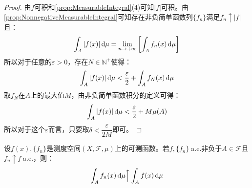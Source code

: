 \begin{proof}
	由$f$可积和\cref{prop:MeasurableIntegral}(4)可知$|f|$可积。由\cref{prop:NonnegativeMeasurableIntegral}可知存在非负简单函数列$\{f_n\}$满足$f_n\uparrow |f|$且：
	\begin{equation*}
		\int_{A}|f(x)|\mathop{}\!\mathrm{d}\mu=\lim_{n\to+\infty}\left[\int_{A}f_n(x)\mathop{}\!\mathrm{d}\mu\right]
	\end{equation*}
	所以对于任意的$\varepsilon>0$，存在$N\in\mathbb{N}^+$使得：
	\begin{equation*}
		\int_{A}|f(x)|\mathop{}\!\mathrm{d}\mu<\frac{\varepsilon}{2}+\int_{A}f_N(x)\mathop{}\!\mathrm{d}\mu
	\end{equation*}
	取$f_N$在$A$上的最大值$M$，由非负简单函数积分的定义可得：
	\begin{equation*}
		\int_{A}|f(x)|\mathop{}\!\mathrm{d}\mu<\frac{\varepsilon}{2}+M\mu(A)
	\end{equation*}
	所以对于这个$\varepsilon$而言，只要取$\delta<\dfrac{\varepsilon}{2M}$即可。
\end{proof}
\begin{theorem}\label{theo:LeviTheorem}
	设$f(x),\{f_n\}$是测度空间$(X,\mathscr{F},\mu)$上的可测函数。若$f,\{f_n\}\;$a.e.非负于$A\in\mathscr{F}$且$f_n\uparrow f\;$a.e.，则：
	\begin{equation*}
		\int_{A}f_n(x)\mathop{}\!\mathrm{d}\mu\Big\uparrow\int_{A}f(x)\mathop{}\!\mathrm{d}\mu
	\end{equation*}
\end{theorem}
